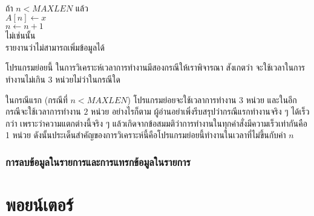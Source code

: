 \begin{algt}
\\
\hspace*{0.2in} ถ้า $n < MAXLEN$ แล้ว\\
\hspace*{0.2in}\hspace*{0.2in} $A[n] \leftarrow x$\\
\hspace*{0.2in}\hspace*{0.2in} $n \leftarrow n + 1$\\
\hspace*{0.2in} ไม่{\wbr}เช่นนั้น\\
\hspace*{0.2in}\hspace*{0.2in} รายงาน{\wbr}ว่า{\wbr}ไม่{\wbr}สามารถ{\wbr}เพิ่ม{\wbr}ข้อมูล{\wbr}ได้{\wbr}
\end{algt}

โปรแกรมย่อย{\wbr}นี้ ใน{\wbr}การ{\wbr}วิเคราะห์{\wbr}เวลา{\wbr}การ{\wbr}ทำงาน{\wbr}มี{\wbr}สอง{\wbr}กรณี{\wbr}ให้{\wbr}เรา{\wbr}พิจารณา สังเกต{\wbr}ว่า{\wbr}
จะ{\wbr}ใช้เวลา{\wbr}ใน{\wbr}การ{\wbr}ทำงาน{\wbr}ไม่{\wbr}เกิน $3$ หน่วย{\wbr}ไม่ว่า{\wbr}ใน{\wbr}กรณี{\wbr}ใด 

ใน{\wbr}กรณี{\wbr}แรก (กรณี{\wbr}ที่ $n<MAXLEN$) โปรแกรมย่อย{\wbr}จะ{\wbr}ใช้เวลา{\wbr}การ{\wbr}ทำงาน $3$ หน่วย{\wbr}
และ{\wbr}ใน{\wbr}อีก{\wbr}กรณี{\wbr}จะ{\wbr}ใช้เวลา{\wbr}การ{\wbr}ทำงาน $2$ หน่วย อย่างไรก็ตาม{\wbr}
ผู้อ่าน{\wbr}อย่า{\wbr}เพิ่ง{\wbr}รีบ{\wbr}สรุป{\wbr}ว่า{\wbr}กรณี{\wbr}แรก{\wbr}ทำงาน{\wbr}จริง ๆ ได้{\wbr}เร็ว{\wbr}กว่า เพราะว่า{\wbr}ความ{\wbr}แตกต่าง{\wbr}นี้{\wbr}จริง ๆ
แล้ว{\wbr}เกิด{\wbr}จาก{\wbr}ข้อสมมติ{\wbr}ว่า{\wbr}การ{\wbr}ทำงาน{\wbr}ใน{\wbr}ทุก{\wbr}คำสั่ง{\wbr}มี{\wbr}ความ{\wbr}เร็ว{\wbr}เท่า{\wbr}กัน{\wbr}คือ 1 หน่วย{\wbr}
ดังนั้น{\wbr}ประเด็น{\wbr}สำคัญ{\wbr}ของ{\wbr}การ{\wbr}วิเคราะห์{\wbr}นี้{\wbr}คือ{\wbr}โปรแกรมย่อย{\wbr}นี้{\wbr}ทำงาน{\wbr}ใน{\wbr}เวลา{\wbr}ที่{\wbr}ไม่{\wbr}ขึ้น{\wbr}กับ{\wbr}ค่า $n$


\subsubsection{การ{\wbr}ลบ{\wbr}ข้อมูล{\wbr}ใน{\wbr}รายการ{\wbr}และ{\wbr}การ{\wbr}แทรก{\wbr}ข้อมูล{\wbr}ใน{\wbr}รายการ}

\section{พอยน์เตอร์}

